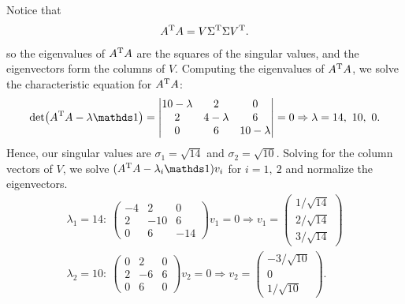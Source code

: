 
Notice that 
\begin{eqnarray}
    \label{eq:A-AT}
    A^{\rm T} A = V \Sigma^{\rm T} \Sigma V^{\rm T}
.\end{eqnarray}
so the eigenvalues of $A^{\rm T} A$ are the squares of the singular values, and the eigenvectors form the columns of $V$. 
Computing the eigenvalues of $A^{\rm T} A$, we solve the characteristic equation for $A^{\rm T} A$:
\begin{eqnarray}
    \label{eq:AT-A}
    \det(A^{\rm T} A - \lambda \id) = 
    \begin{vmatrix}
        10 - \lambda & 2 & 0 \\
        2  & 4 - \lambda & 6 \\
        0  & 6 & 10 - \lambda 
    \end{vmatrix}
    =
    0
    \Rightarrow \lambda = 14,~10,~0
.\end{eqnarray}
Hence, our singular values are $\sigma_1 = \sqrt{14}$ and $\sigma_2 = \sqrt{10}$.
Solving for the column vectors of $V$, we solve $(A^{\rm T}A - \lambda_i \id) v_i$ for $i = 1,~2$ and normalize the eigenvectors.
\begin{align*}
    \label{eq:v1-v2}
    \lambda_1 = 14:~
    \begin{pmatrix}
    -4 & 2 & 0 \\
    2 & -10 & 6 \\
    0 & 6 & -14
    \end{pmatrix}
    v_1
    = 0
    \Rightarrow v_1 = 
    \begin{pmatrix}
    1/\sqrt{14} \\ 2/\sqrt{14} \\ 3/\sqrt{14}
    \end{pmatrix} \\
    \lambda_2 = 10:~
    \begin{pmatrix}
    0 & 2 & 0 \\
    2 & -6 & 6 \\
    0 & 6 & 0
    \end{pmatrix}
    v_2
    = 0
    \Rightarrow v_2 = 
    \begin{pmatrix}
    -3/\sqrt{10} \\ 0 \\ 1/\sqrt{10} 
    \end{pmatrix} 
.\end{align*}
